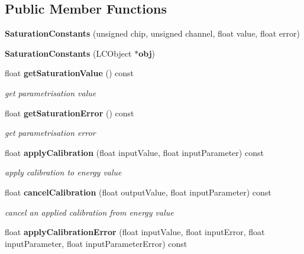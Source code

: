 \subsection*{Public Member Functions}
\begin{DoxyCompactItemize}
\item 
{\bfseries Saturation\-Constants} (unsigned chip, unsigned channel, float value, float error)\label{classCALICE_1_1SaturationConstants_ab78ca41a50dc74eddb2b82274dda4b96}

\item 
{\bfseries Saturation\-Constants} (L\-C\-Object $\ast${\bf obj})\label{classCALICE_1_1SaturationConstants_a327dd2cc0ea1c5d5160e6693593d6587}

\item 
float {\bf get\-Saturation\-Value} () const \label{classCALICE_1_1SaturationConstants_a692c4d27fbada5699cb12c91c38653ab}

\begin{DoxyCompactList}\small\item\em get parametrisation value \end{DoxyCompactList}\item 
float {\bf get\-Saturation\-Error} () const \label{classCALICE_1_1SaturationConstants_a9079460ba4174a3f95d12b0b647af98b}

\begin{DoxyCompactList}\small\item\em get parametrisation error \end{DoxyCompactList}\item 
float {\bf apply\-Calibration} (float input\-Value, float input\-Parameter) const \label{classCALICE_1_1SaturationConstants_a9ffdaea1fa36d7f63483fa5438e870fc}

\begin{DoxyCompactList}\small\item\em apply calibration to energy value \end{DoxyCompactList}\item 
float {\bf cancel\-Calibration} (float output\-Value, float input\-Parameter) const \label{classCALICE_1_1SaturationConstants_a551dcb6656eac067e5f88113eb443322}

\begin{DoxyCompactList}\small\item\em cancel an applied calibration from energy value \end{DoxyCompactList}\item 
float {\bf apply\-Calibration\-Error} (float input\-Value, float input\-Error, float input\-Parameter, float input\-Parameter\-Error) const \label{classCALICE_1_1SaturationConstants_a62846bb8c332310f5db4d2c31333ce11}


\end{DoxyCompactItemize}

